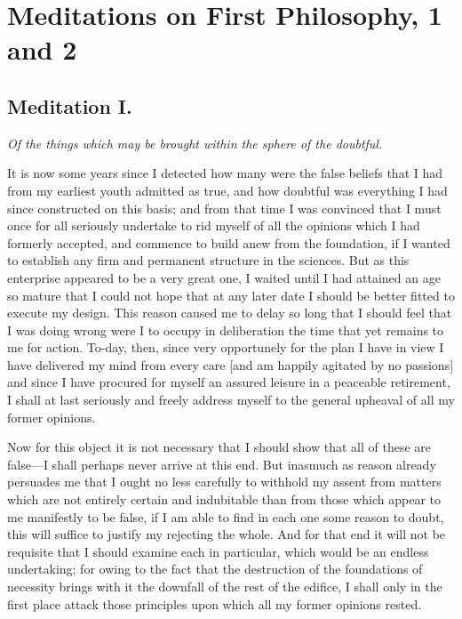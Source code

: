 
\author{Ren\'e Descartes}
\chapter[Ren\'e Descartes -- Meditiations on First Philosophy, 1 and
2]{Meditations on First Philosophy, 1 and 2}


\section*{Meditation I.}

\begin{center}\textit{Of the things which may be brought within the
sphere of the doubtful.}\end{center}

It is now some years since I detected how many were the false beliefs
that I had from my earliest youth admitted as true, and how doubtful
was everything I had since constructed on this basis; and from that
time I was convinced that I must once for all seriously undertake to
rid myself of all the opinions which I had formerly accepted, and
commence to build anew from the foundation, if I wanted to establish
any firm and permanent structure in the sciences. But as this
enterprise appeared to be a very great one, I waited until I had
attained an age so mature that I could not hope that at any later date
I should be better fitted to execute my design. This reason caused me
to delay so long that I should feel that I was doing wrong were I to
occupy in deliberation the time that yet remains to me for action.
To-day, then, since very opportunely for the plan I have in view I
have delivered my mind from every care [and am happily agitated by no
passions] and since I have procured for myself an assured leisure in a
peaceable retirement, I shall at last seriously and freely address
myself to the general upheaval of all my former opinions.

Now for this object it is not necessary that I should show
that all of these are false---I shall perhaps never arrive at this
end. But inasmuch as reason already persuades me that I ought no less
carefully to withhold my assent from matters which are not entirely
certain and indubitable than from those which appear to me
manifestly to be false, if I am able to find in each one some reason
to doubt, this will suffice to justify my rejecting the whole. And for
that end it will not be requisite that I should examine each in
particular, which would be an endless undertaking; for owing to the
fact that the destruction of the foundations of necessity brings with
it the downfall of the rest of the edifice, I shall only in the first
place attack those principles upon which all my former opinions
rested.

